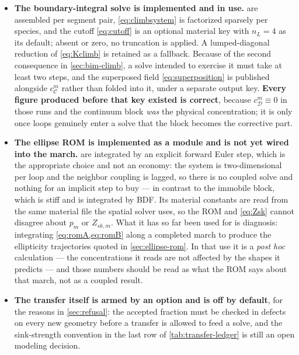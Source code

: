 \documentclass{article}
\begin{document}
\begin{itemize}
\item \textbf{The boundary-integral solve is implemented and in use.}
       are assembled per segment pair,
      \cref{eq:climbsystem} is factorized sparsely per species, and the cutoff
      \cref{eq:cutoff} is an optional material key with $n_L=4$ as its default;
      absent or zero, no truncation is applied. A lumped-diagonal reduction of
      \cref{eq:Kclimb} is retained as a fallback. Because of the second
      consequence in \cref{sec:bim-climb}, a solve intended to exercise it must
      take at least two steps, and the superposed field \cref{eq:superposition}
      is published alongside $c^m_{\mathcal C}$ rather than folded into it, under
      a separate output key. \textbf{Every figure produced before that key existed
      is correct}, because $c^m_{\mathcal D}\equiv0$ in those runs and the
      continuum block \emph{was} the physical concentration; it is only once loops
      genuinely enter a solve that the block becomes the corrective part.
\item \textbf{The ellipse ROM is implemented as a module and is not yet wired into
      the march.}  are integrated by an explicit forward
      Euler step, which is the appropriate choice and not an economy: the system
      is two-dimensional per loop and the neighbor coupling is lagged, so there
      is no coupled solve and nothing for an implicit step to buy --- in contrast
      to the immobile block, which is stiff and is integrated by BDF. Its material
      constants are read from the same material file the spatial solver uses, so
      the ROM and \cref{eq:Zsk} cannot disagree about $p_m$ or $Z_{sk,m}$. What it
      has so far been used for is diagnosis: integrating \cref{eq:romA,eq:romB}
      along a completed march to produce the ellipticity trajectories quoted in
      \cref{sec:ellipse-rom}. In that use it is a \emph{post hoc} calculation ---
      the concentrations it reads are not affected by the shapes it predicts ---
      and those numbers should be read as what the ROM says about that march, not
      as a coupled result.
\item \textbf{The transfer itself is armed by an option and is off by default},
      for the reasons in \cref{sec:refusal}: the accepted fraction must be checked
      in defects on every new geometry before a transfer is allowed to feed a
      solve, and the sink-strength convention in the last row of
      \cref{tab:transfer-ledger} is still an open modeling decision.
\end{itemize}
\end{document}
